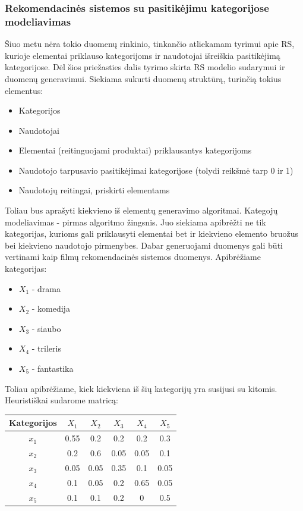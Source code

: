 \documentclass{VUMIFInfMagistrinis}
\begin{document}
\subsubsection{Rekomendacinės sistemos su pasitikėjimu kategorijose modeliavimas}
\indent
Šiuo metu nėra tokio duomenų rinkinio, tinkančio atliekamam tyrimui apie RS, kurioje elementai priklauso kategorijoms ir naudotojai išreiškia pasitikėjimą kategorijose. Dėl šios priežasties dalis tyrimo skirta RS modelio sudarymui ir duomenų generavimui. Siekiama sukurti duomenų struktūrą, turinčią tokius elementus:
\begin{itemize}
	\item Kategorijos
	\item Naudotojai
	\item Elementai (reitinguojami produktai) priklausantys kategorijoms
	\item Naudotojo tarpusavio pasitikėjimai kategorijose (tolydi reikšmė tarp 0 ir 1)
	\item Naudotojų reitingai, priskirti elementams
\end{itemize}
Toliau bus aprašyti kiekvieno iš elementų generavimo algoritmai.
\indent
Kategojų modeliavimas - pirmas algoritmo žingsnis. Juo siekiama apibrėžti ne tik kategorijas, kurioms gali priklausyti elementai bet ir kiekvieno elemento bruožus bei kiekvieno naudotojo pirmenybes. Dabar generuojami duomenys gali būti vertinami kaip filmų rekomendacinės sistemos duomenys. Apibrėžiame kategorijas:
\begin{itemize}
	\item $X_1$ - drama
	\item $X_2$ - komedija
	\item $X_3$ - siaubo
	\item $X_4$ - trileris
	\item $X_5$ - fantastika
\end{itemize}
Toliau apibrėžiame, kiek kiekviena iš šių kategorijų yra susijusi su kitomis. Heuristiškai sudarome matricą:
\begin{center}
	\begin{tabular}{||c c c c c c||} 
		\hline
		Kategorijos & $X_1$ & $X_2$ & $X_3$ & $X_4$ & $X_5$ \\ [0.5ex] 
		\hline\hline
		$x_1$ & 0.55 & 0.2 & 0.2 & 0.2 & 0.3 \\ 
		\hline
		$x_2$ & 0.2 & 0.6 & 0.05 & 0.05 & 0.1 \\
		\hline
		$x_3$ & 0.05 & 0.05 & 0.35 & 0.1 & 0.05 \\
		\hline
		$x_4$ & 0.1 & 0.05 & 0.2 & 0.65 & 0.05 \\
		\hline
		$x_5$ & 0.1 & 0.1 & 0.2 & 0 & 0.5 \\ [1ex] 
		\hline
	\end{tabular}
\end{center}
\end{document}
